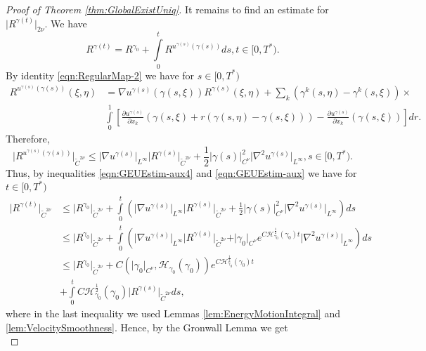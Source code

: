 \documentclass[11pt,a4paper,leqno]{amsart}%
\newcommand\half{\frac12}
\theoremstyle{plain}
\theoremstyle{remark}
\theoremstyle{plain}
\numberwithin{equation}{section}
\def\suml{\sum\limits}
\def\intl{\int\limits}
\begin{document}
\begin{proof}[Proof of Theorem \ref{thm:GlobalExistUniq}]
It remains to find an estimate for $\vert R^{\gamma(t)}\vert_{2\nu}$. We
have
\begin{equation}
R^{\gamma(t)}=R^{\gamma_0}+\intl_0^tR^{u^{\gamma(s)}(\gamma(s))}ds,t\in[0,T^*).
\end{equation}
By identity \eqref{eqn:RegularMap-2} we have for $s\in[0,T^*)$
\begin{align}
R^{u^{\gamma(s)}(\gamma(s))}(\xi,\eta)&=\nabla
u^{\gamma(s)}(\gamma(s,\xi))R^{\gamma(s)}(\xi,\eta)+
\suml_k(\gamma^k(s,\eta)-\gamma^k(s,\xi))\times\nonumber\\
&\intl_0^1\left[\frac{\partial u^{\gamma(s)}}{\partial
x_k}(\gamma(s,\xi)+r(\gamma(s,\eta)-\gamma(s,\xi)))-\frac{\partial
u^{\gamma(s)}}{\partial
x_k}(\gamma(s,\xi))\right]dr.\label{eqn:GEUEstim-aux3}
\end{align}
Therefore,
\begin{equation}
\vert R^{u^{\gamma(s)}(\gamma(s))}\vert_{\tilde{C}^{2\nu}}\leq \vert \nabla
u^{\gamma(s)}\vert_{L^{\infty}}\vert R^{\gamma(s)}\vert_{\tilde{C}^{2\nu}}+\frac{1}{2}\vert \gamma(s)\vert_{C^{\nu}}^2\vert \nabla^2
u^{\gamma(s)}\vert_{L^{\infty}},s\in[0,T^*).\label{eqn:GEUEstim-aux4}
\end{equation}
Thus, by inequalities \eqref{eqn:GEUEstim-aux4} and
\eqref{eqn:GEUEstim-aux} we have for $t\in[0,T^*)$
\begin{align}
\vert R^{\gamma(t)}\vert_{\tilde{C}^{2\nu}}&\leq\vert R^{\gamma_0}\vert_{\tilde{C}^{2\nu}}+\intl_0^t(\vert \nabla
u^{\gamma(s)}\vert_{L^{\infty}}\vert R^{\gamma(s)}\vert_{\tilde{C}^{2\nu}}+\frac{1}{2}\vert \gamma(s)\vert_{C^{\nu}}^2\vert \nabla^2
u^{\gamma(s)}\vert_{L^{\infty}})ds\nonumber\\
&\leq\vert R^{\gamma_0}\vert_{\tilde{C}^{2\nu}}+\intl_0^t(\vert \nabla
u^{\gamma(s)}\vert_{L^{\infty}}\vert R^{\gamma(s)}\vert_{\tilde{C}^{2\nu}}+\vert \gamma_0\vert_{C^{\nu}}e^{C\mathcal{H}_{\gamma_0}^{\half}(\gamma_0)t}\vert \nabla^2
u^{\gamma(s)}\vert_{L^{\infty}})ds\nonumber\\
&\leq\vert R^{\gamma_0}\vert_{\tilde{C}^{2\nu}}+C(\vert \gamma_0\vert_{C^{\nu}},\mathcal{H}_{\gamma_0}(\gamma_0))e^{C\mathcal{H}_{\gamma_0}^{\half}(\gamma_0)t}\nonumber\\
&+\intl_0^tC\mathcal{H}_{\gamma_0}^{\half}(\gamma_0)\vert R^{\gamma(s)}\vert_{\tilde{C}^{2\nu}}ds,\label{eqn:GEUEstim-aux5}
\end{align}
where in the last inequality we used Lemmas
\ref{lem:EnergyMotionIntegral} and \ref{lem:VelocitySmoothness}.
Hence, by the Gronwall Lemma we get
\begin{equation}

\end{equation}
\end{proof}
\end{document}
